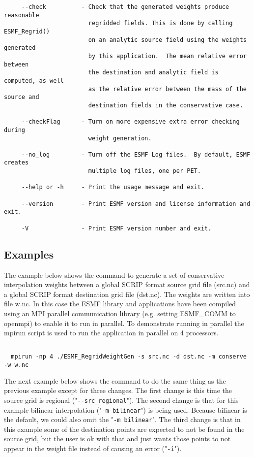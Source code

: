 \begin{verbatim}
     --check          - Check that the generated weights produce reasonable 
                        regridded fields. This is done by calling ESMF_Regrid() 
                        on an analytic source field using the weights generated 
                        by this application.  The mean relative error between 
                        the destination and analytic field is computed, as well 
                        as the relative error between the mass of the source and 
                        destination fields in the conservative case.

     --checkFlag      - Turn on more expensive extra error checking during 
                        weight generation.

     --no_log         - Turn off the ESMF Log files.  By default, ESMF creates 
                        multiple log files, one per PET.

     --help or -h     - Print the usage message and exit.

     --version        - Print ESMF version and license information and exit.

     -V               - Print ESMF version number and exit.
\end{verbatim}


\subsection{Examples}

The example below shows the command to generate a set of conservative interpolation weights between a global
SCRIP format source grid file (src.nc) and a global SCRIP format destination grid file (dst.nc). The weights
are written into file w.nc. In this case the
ESMF library and applications have been compiled using an MPI parallel communication library
(e.g. setting ESMF\_COMM to openmpi) to enable it to run in parallel. To demonstrate running in parallel
the mpirun script is used to run the application in parallel on 4 processors.

\begin{verbatim}

  mpirun -np 4 ./ESMF_RegridWeightGen -s src.nc -d dst.nc -m conserve -w w.nc

\end{verbatim}

The next example below shows the command to do the same thing as the previous example except for three changes. The first
change is this time the source grid is regional ("{\tt \verb+--+src\_regional}"). The second change is that
for this example bilinear interpolation ("{\tt -m bilinear}") is being used. Because bilinear is the default, we could also
omit the "{\tt -m bilinear}". The third change is that in this example some of the destination points are expected to
not be found in the source grid, but the user is ok with that and just wants those points to not appear in the weight file instead of causing an error ("{\tt -i}").

